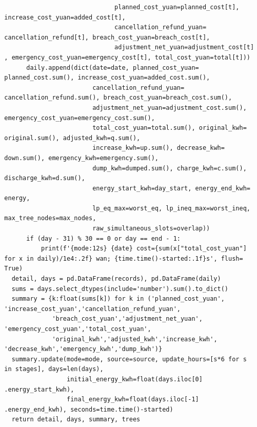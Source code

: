 \begin{verbatim}
                                planned_cost_yuan=planned_cost[t],
  increase_cost_yuan=added_cost[t],
                                cancellation_refund_yuan=
  cancellation_refund[t], breach_cost_yuan=breach_cost[t],
                                adjustment_net_yuan=adjustment_cost[t]
  , emergency_cost_yuan=emergency_cost[t], total_cost_yuan=total[t]))
        daily.append(dict(date=date, planned_cost_yuan=
  planned_cost.sum(), increase_cost_yuan=added_cost.sum(),
                          cancellation_refund_yuan=
  cancellation_refund.sum(), breach_cost_yuan=breach_cost.sum(),
                          adjustment_net_yuan=adjustment_cost.sum(),
  emergency_cost_yuan=emergency_cost.sum(),
                          total_cost_yuan=total.sum(), original_kwh=
  original.sum(), adjusted_kwh=q.sum(),
                          increase_kwh=up.sum(), decrease_kwh=
  down.sum(), emergency_kwh=emergency.sum(),
                          dump_kwh=dumped.sum(), charge_kwh=c.sum(),
  discharge_kwh=d.sum(),
                          energy_start_kwh=day_start, energy_end_kwh=
  energy,
                          lp_eq_max=worst_eq, lp_ineq_max=worst_ineq,
  max_tree_nodes=max_nodes,
                          raw_simultaneous_slots=overlap))
        if (day - 31) % 30 == 0 or day == end - 1:
            print(f'{mode:12s} {date} cost={sum(x["total_cost_yuan"]
  for x in daily)/1e4:.2f} wan; {time.time()-started:.1f}s', flush=
  True)
    detail, days = pd.DataFrame(records), pd.DataFrame(daily)
    sums = days.select_dtypes(include='number').sum().to_dict()
    summary = {k:float(sums[k]) for k in ('planned_cost_yuan',
  'increase_cost_yuan','cancellation_refund_yuan',
               'breach_cost_yuan','adjustment_net_yuan',
  'emergency_cost_yuan','total_cost_yuan',
               'original_kwh','adjusted_kwh','increase_kwh',
  'decrease_kwh','emergency_kwh','dump_kwh')}
    summary.update(mode=mode, source=source, update_hours=[s*6 for s
  in stages], days=len(days),
                   initial_energy_kwh=float(days.iloc[0]
  .energy_start_kwh),
                   final_energy_kwh=float(days.iloc[-1]
  .energy_end_kwh), seconds=time.time()-started)
    return detail, days, summary, trees



\end{verbatim}
